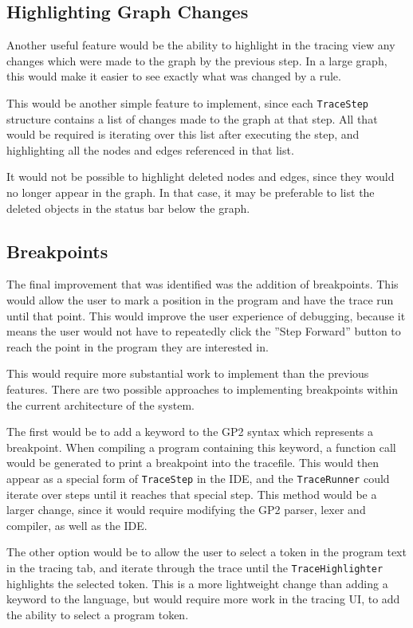 \documentclass[authoryearcitations]{UoYCSproject}
\begin{document}
\subsection{Highlighting Graph Changes}
\label{sec:HighlightingGraphChanges}

Another useful feature would be the ability to highlight in the tracing
view any changes which were made to the graph by the previous step. In a large
graph, this would make it easier to see exactly what was changed by a rule.

This would be another simple feature to implement, since each \texttt{TraceStep}
structure contains a list of changes made to the graph at that step. All that
would be required is iterating over this list after executing the step, and
highlighting all the nodes and edges referenced in that list.

It would not be possible to highlight deleted nodes and edges, since they would
no longer appear in the graph. In that case, it may be preferable to list the
deleted objects in the status bar below the graph.

\subsection{Breakpoints}
\label{sec:FWBreakpoints}

The final improvement that was identified was the addition of breakpoints. This
would allow the user to mark a position in the program and have the trace run
until that point. This would improve the user experience of debugging, because
it means the user would not have to repeatedly click the ''Step Forward'' button
to reach the point in the program they are interested in.

This would require more substantial work to implement than the previous
features. There are two possible approaches to implementing breakpoints within
the current architecture of the system.

The first would be to add a keyword to the GP2 syntax which represents a
breakpoint. When compiling a program containing this keyword, a function call
would be generated to print a breakpoint into the tracefile. This would then
appear as a special form of \texttt{TraceStep} in the IDE, and the \texttt{TraceRunner}
could iterate over steps until it reaches that special step. This method would
be a larger change, since it would require modifying the GP2 parser, lexer and
compiler, as well as the IDE.

The other option would be to allow the user to select a token in the program
text in the tracing tab, and iterate through the trace until the \texttt{TraceHighlighter}
highlights the selected token. This is a more lightweight change than adding
a keyword to the language, but would require more work in the tracing UI, to 
add the ability to select a program token.
\end{document}
